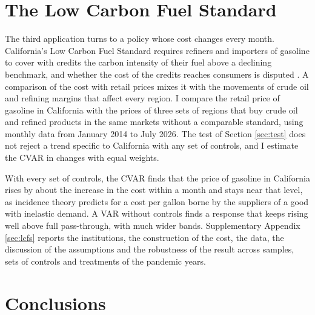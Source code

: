 \documentclass[12pt,a4paper]{article}
\theoremstyle{definition}
\theoremstyle{definition}\newtheorem{example}{Example}
\theoremstyle{definition}\newtheorem{definition}{Definition}
\begin{document}
\section{The Low Carbon Fuel Standard\label{sec:lcfssum}}

The third application turns to a policy whose cost changes every month. California's Low Carbon Fuel Standard requires refiners and importers of gasoline to cover with credits the carbon intensity of their fuel above a declining benchmark, and whether the cost of the credits reaches consumers is disputed \citep{CARB2024,KleinmanCenter2024}. A comparison of the cost with retail prices mixes it with the movements of crude oil and refining margins that affect every region. I compare the retail price of gasoline in California with the prices of three sets of regions that buy crude oil and refined products in the same markets without a comparable standard, using monthly data from January 2014 to July 2026. The test of Section \ref{sec:test} does not reject a trend specific to California with any set of controls, and I estimate the CVAR in changes with equal weights.

With every set of controls, the CVAR finds that the price of gasoline in California rises by about the increase in the cost within a month and stays near that level, as incidence theory predicts for a cost per gallon borne by the suppliers of a good with inelastic demand. A VAR without controls finds a response that keeps rising well above full pass-through, with much wider bands. Supplementary Appendix \ref{sec:lcfs} reports the institutions, the construction of the cost, the data, the discussion of the assumptions and the robustness of the result across samples, sets of controls and treatments of the pandemic years.

\section{Conclusions\label{sec:conclusions}}
\end{document}
